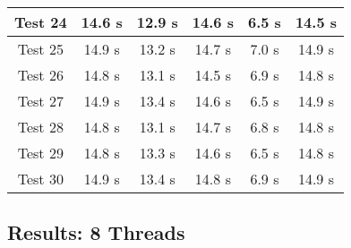 \documentclass[12pt]{article}
\begin{document}
\begin{tabular}{ | c | c | c | c | c | c | }
  Test 24& 14.6 s& 12.9 s& 14.6 s& 6.5 s& 14.5 s\\ \hline 
  Test 25& 14.9 s& 13.2 s& 14.7 s& 7.0 s& 14.9 s\\ \hline 
  Test 26& 14.8 s& 13.1 s& 14.5 s& 6.9 s& 14.8 s\\ \hline 
  Test 27& 14.9 s& 13.4 s& 14.6 s& 6.5 s& 14.9 s\\ \hline 
  Test 28& 14.8 s& 13.1 s& 14.7 s& 6.8 s& 14.8 s\\ \hline 
  Test 29& 14.8 s& 13.3 s& 14.6 s& 6.5 s& 14.8 s\\ \hline 
  Test 30& 14.9 s& 13.4 s& 14.8 s& 6.9 s& 14.9 s\\ \hline 
  \end{tabular}
  
  

\subsection{Results: 8 Threads}
\end{document}

